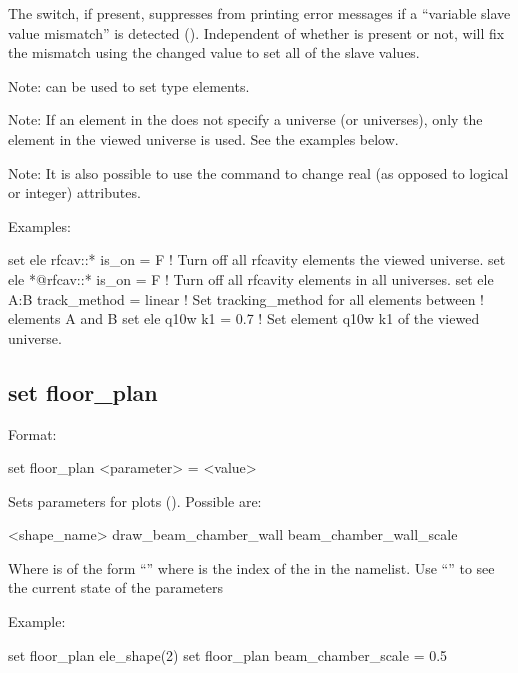 {{The  switch, if present, suppresses \tao from printing error messages if a ``variable
slave value mismatch'' is detected (). Independent of whether  is
present or not, \tao will fix the mismatch using the changed value to set all of the slave values.

Note:  can be used to set  type elements.

Note: If an element in the  does not specify a universe (or universes),
only the element in the viewed universe is used. See the examples below.

Note: It is also possible to use the  command to change real (as opposed to
logical or integer) attributes.

Examples:
\begin{example}
  set ele rfcav::* is_on = F        ! Turn off all rfcavity elements the viewed universe.
  set ele *@rfcav::* is_on = F      ! Turn off all rfcavity elements in all universes.
  set ele A:B track_method = linear ! Set tracking_method for all elements between 
                                    !   elements A and B
  set ele q10w k1 = 0.7             ! Set element q10w k1 of the viewed universe.
\end{example}


\subsection{set floor_plan}
\label{s:set.floor.plan}

Format:
\begin{example}
  set floor_plan <parameter> = <value>
\end{example}


Sets parameters for  plots ().  Possible  are:
\begin{example}
  <shape_name>%
  draw_beam_chamber_wall
  beam_chamber_wall_scale
\end{example}
Where  is of the form ``'' where  is the index of
the  in the  namelist.  Use ``'' to
see the current state of the  parameters

Example:
\begin{example}
  set floor_plan ele_shape(2)%
  set floor_plan beam_chamber_scale = 0.5
\end{example}

}}
